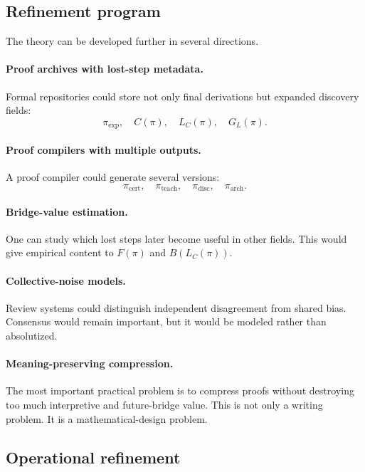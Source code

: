 \documentclass[11pt]{article}
\theoremstyle{definition}
\theoremstyle{remark}
\begin{document}
\subsection{Refinement program}

The theory can be developed further in several directions.

\paragraph{Proof archives with lost-step metadata.}
Formal repositories could store not only final derivations but expanded discovery fields:
\[
        \pi_{\mathrm{exp}},\quad C(\pi),\quad L_C(\pi),\quad G_L(\pi).
\]

\paragraph{Proof compilers with multiple outputs.}
A proof compiler could generate several versions:
\[
        \pi_{\mathrm{cert}},
        \quad
        \pi_{\mathrm{teach}},
        \quad
        \pi_{\mathrm{disc}},
        \quad
        \pi_{\mathrm{arch}}.
\]

\paragraph{Bridge-value estimation.}
One can study which lost steps later become useful in other fields.  This would give empirical content to $F(\pi)$ and $B(L_C(\pi))$.

\paragraph{Collective-noise models.}
Review systems could distinguish independent disagreement from shared bias.  Consensus would remain important, but it would be modeled rather than absolutized.

\paragraph{Meaning-preserving compression.}
The most important practical problem is to compress proofs without destroying too much interpretive and future-bridge value.  This is not only a writing problem.  It is a mathematical-design problem.


\subsection{Operational refinement}
\end{document}

